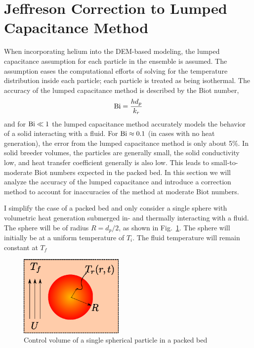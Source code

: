 %
%
\section{Jeffreson Correction to Lumped Capacitance Method}\label{sec:ht-jeffreson-correction}
When incorporating helium into the DEM-based modeling, the lumped capacitance assumption for each particle in the ensemble is assumed. The assumption eases the computational efforts of solving for the temperature distribution inside each particle; each particle is treated as being isothermal. The accuracy of the lumped capacitance method is described by the Biot number,
\begin{equation}
     \mathrm{Bi} = \frac{hd_p}{k_r}
\end{equation} 
and for $\mathrm{Bi} \ll 1$ the lumped capacitance method accurately models the behavior of a solid interacting with a fluid. For $\mathrm{Bi} \approx 0.1$ (in cases with no heat generation), the error from the lumped capacitance method is only about 5\%. In solid breeder volumes, the particles are generally small, the solid conductivity low, and heat transfer coefficient generally is also low. This leads to small-to-moderate Biot numbers expected in the packed bed. In this section we will analyze the accuracy of the lumped capacitance and introduce a correction method to account for inaccuracies of the method at moderate Biot numbers.

I simplify the case of a packed bed and only consider a single sphere with volumetric heat generation submerged in- and thermally interacting with a fluid. The sphere will be of radius $R=d_p/2$, as shown in Fig.~\ref{fig:ParticleControlVolume}. The sphere will initially be at a uniform temperature of $T_i$. The fluid temperature will remain constant at $T_f$

\begin{figure}[ht]
	\centering
		\includegraphics[width=2in]{figures/ParticleControlVolume}
	\caption[Control volume of single spherical particle in a packed bed]{Control volume of a single spherical particle in a packed bed}
	\label{fig:ParticleControlVolume}
\end{figure}



